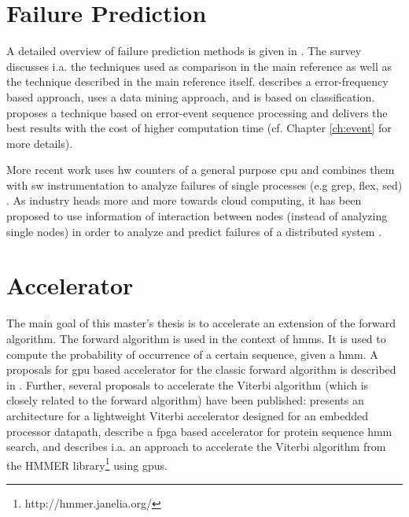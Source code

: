 \documentclass[mscthesis]{usiinfthesis}
\begin{document}
\section{Failure Prediction}
\label{ch:art_pred}
A detailed overview of failure prediction methods is given in
\cite{ACM10_Salfner}. The survey discusses i.a. the techniques used as
comparison in the main reference
\cite{lin88,IEEE90_lin,ICDM02_Vilalta,domeniconi02} as well as the technique
described in the main reference \cite{salfner08} itself. \cite{lin88} describes
a error-frequency based approach, \cite{ICDM02_Vilalta} uses a data mining
approach, and \cite{domeniconi02} is based on classification. \cite{salfner08}
proposes a technique based on error-event sequence processing and delivers
the best results with the cost of higher computation time (cf. Chapter
\ref{ch:event} for more details).

More recent work uses \gls{hw} counters of a general purpose \gls{cpu} and
combines them with \gls{sw} instrumentation to analyze failures of single
processes (e.g grep, flex, sed) \cite{FSE10_Yilmaz}. As industry heads more and
more towards cloud computing, it has been proposed to use information of
interaction between nodes (instead of analyzing single nodes) in order to
analyze and predict failures of a distributed system
\cite{IEEE12_Salfner,DSN10_Oliner}.

\section{Accelerator}
\label{ch:art_acc}

The main goal of this master's thesis is to accelerate an extension of the
forward algorithm. The forward algorithm is used in the context of \glspl{hmm}.
It is used to compute the probability of occurrence of a certain sequence,
given a \gls{hmm}. A proposals for \gls{gpu} based accelerator for the classic
forward algorithm is described in \cite{liu09}. Further, several proposals to
accelerate the Viterbi algorithm (which is closely related to the forward
algorithm) have been published: \cite{ASAP12_Azhar} presents an architecture
for a lightweight Viterbi accelerator designed for an embedded processor
datapath, \cite{IPDPS07_Jacob,ICS06_Maddimsetty,IPDPS07_Oliver} describe
a \gls{fpga} based accelerator for protein sequence \gls{hmm} search, and
\cite{IPDPS09_Walters} describes i.a. an approach to accelerate the Viterbi
algorithm from the HMMER library\footnote{http://hmmer.janelia.org/} using
\glspl{gpu}.
\end{document}
